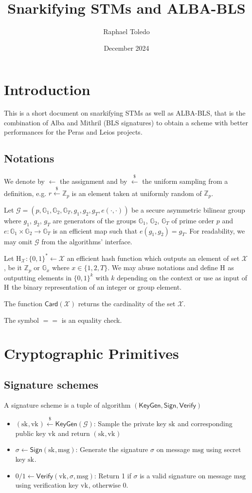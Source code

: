 \documentclass{article}
\title{Snarkifying STMs and ALBA-BLS}
\author{Raphael Toledo}
\date{December 2024}
\newcommand{\isequal}{\ensuremath{==}\xspace}
\newcommand{\Zp}{\ensuremath{\mathbb{Z}_p}\xspace}
\newcommand{\G}[1]{\ensuremath{\mathbb{G}_{#1}}\xspace}
\newcommand{\Hash}[1]{\ensuremath{\textrm{H}_{#1}}\xspace}
\newcommand{\vk}[1]{\ensuremath{\textrm{vk}_{#1}}\xspace}
\newcommand{\sk}[1]{\ensuremath{\textrm{sk}_{#1}}\xspace}
\newcommand{\e}[2]{\ensuremath{e(#1,\xspace #2)}\xspace}
\newcommand{\m}{\ensuremath{\textrm{msg}}\xspace}
\newcommand{\KeyGen}{\ensuremath{\mathsf{KeyGen}}\xspace}
\newcommand{\Sign}{\ensuremath{\mathsf{Sign}}\xspace}
\newcommand{\Verify}{\ensuremath{\mathsf{Verify}}\xspace}
\newcommand{\sample}{\ensuremath{\xleftarrow{\$}}\xspace}
\begin{document}
\maketitle

%
%
%
\section{Introduction}
This is a short document on snarkifying STMs as well as ALBA-BLS, that is the combination of Alba and Mithril (BLS signatures) to obtain a scheme with better performances for the Peras and Leios projects.

%
%
\subsection{Notations}
We denote by $\leftarrow$ the assignment and by $ \sample$ the uniform sampling from a definition, e.g. $r \sample \Zp$ is an element taken at uniformly random of \Zp. 

Let $\mathcal{G} = (p,\G{1}, \G{2}, \G{T}, g_1, g_2, g_T, \e{\cdot}{\cdot})$ be a secure asymmetric bilinear group where $g_1$, $g_2$, $g_T$ are generators of the groups \G{1}, \G{2}, \G{T} of prime order $p$ and $e \colon \G{1} \times \G{2} \xrightarrow{} \G{T}$ is an efficient map such that $\e{g_1}{g_2} = g_T$. For readability, we may omit $\mathcal{G}$ from the algorithms' interface.

Let $\Hash{\mathcal{X}} : \{0,1\}^* \leftarrow \mathcal{X}$ an efficient hash function which outputs an element of set $\mathcal{X}$, be it \Zp or \G{x} where $x \in \{1,2,T\}$. We may abuse notations and define \Hash{} as outputting elements in $\{0,1\}^k$ with $k$ depending on the context or use as input of \Hash{} the binary representation of an integer or group element.

The function $\textsf{Card}(\mathcal{X})$ returns the cardinality of the set $\mathcal{X}$.

The symbol $\isequal$ is an equality check.

%
%
%
\section{Cryptographic Primitives}

%
%
\subsection{Signature schemes}
A signature scheme is a tuple of algorithm $(\KeyGen, \Sign, \Verify)$
\begin{itemize}
    \item $(\sk{}, \vk{}) \sample \KeyGen(\mathcal{G})$: Sample the private key $\sk{}$ and corresponding public key $\vk{}$ and return $(\sk{}, \vk{})$
    \item $\sigma \leftarrow \Sign(\sk{}, \m)$: Generate the signature $\sigma$ on message \m using secret key $\sk{}$.
    \item $0/1 \leftarrow \Verify(\vk{}, \sigma, \m)$: Return 1 if $\sigma$ is a valid signature on message \m using verification key $\vk{}$, otherwise 0.
\end{itemize}
\end{document}

